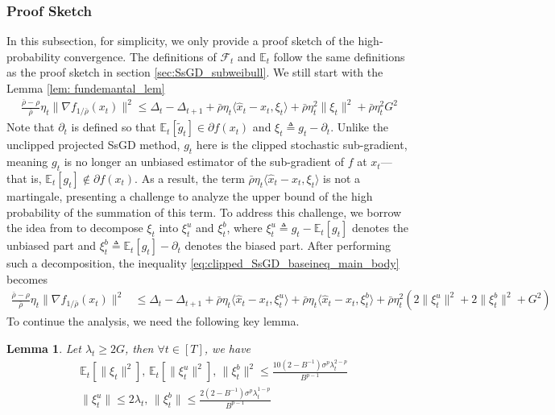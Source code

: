\documentclass{article}
\newtheorem{lemma}{Lemma}
\def \E {\mathbb{E}}
\begin{document}
\subsubsection{Proof Sketch} 
In this subsection, for simplicity, we only provide a proof sketch of the high-probability convergence. The definitions of $\mathcal{F}_t$ and $\E_t$ follow the same definitions as the proof sketch in section \ref{sec:SsGD_subweibull}. 
We still start with the Lemma \ref{lem: fundemantal_lem}
\begin{align}\label{eq:clipped_SsGD_baseineq_main_body}
    \frac{\bar{\rho}-\rho}{\bar{\rho}}\eta_t\|\nabla f_{1/\bar{\rho}}(x_t)\|^2\leq \Delta_t-\Delta_{t+1} + \bar{\rho}\eta_t\langle \hat{x}_t-x_t, \xi_t\rangle + \bar{\rho}\eta_t^2\|\xi_t\|^2 + \bar{\rho}\eta_t^2G^2
\end{align}
Note that $\partial_t$ is defined so that $\mathbb{E}_t[\widetilde{g}_t] \in \partial f(x_t)$ and $\xi_t\triangleq g_t-\partial_t$. Unlike the unclipped projected SsGD method, $g_t$ here is the clipped stochastic sub-gradient, meaning $g_t$ is no longer an unbiased estimator of the sub-gradient of $f$ at $x_t$—that is, $\mathbb{E}_t[g_t] \notin \partial f(x_t)$. As a result, the term $\bar{\rho}\eta_t\langle \hat{x}_t - x_t, \xi_t\rangle$ is not a martingale, presenting a challenge to analyze the upper bound of the high probability of the summation of this term.
To address this challenge, we borrow the idea from \citep{Cutkosky_2021} to decompose $\xi_t$ into $\xi_t^u$ and $\xi_t^b$, where $\xi_t^u \triangleq g_t - \mathbb{E}_t[g_t]$ denotes the unbiased part and $\xi_t^b \triangleq \mathbb{E}_t[g_t] - \partial_t$ denotes the biased part. After performing such a decomposition, the inequality \eqref{eq:clipped_SsGD_baseineq_main_body} becomes
\begin{align}\label{eq: decomposition_fundemental_lemma_clipped_SsGD}
    \frac{\bar{\rho}-\rho}{\bar{\rho}}\eta_t\|\nabla f_{1/\bar{\rho}}(x_t)\|^2 &\leq \Delta_t-\Delta_{t+1}+\bar{\rho}\eta_t\langle \hat{x}_t-x_t,\xi_t^u\rangle+\bar{\rho}\eta_t\langle \hat{x}_t-x_t,\xi_t^b\rangle+ \bar{\rho}\eta_t^2(2\|\xi_t^u\|^2+2\|\xi_t^b\|^2+G^2)
\end{align}
To continue the analysis, we need the following key lemma.
\begin{lemma}\label{lem:key_lemma_clipped_SsGD}
    Let $\lambda_t\geq 2G$, then $\forall t\in[T]$, we have
    \begin{align}
    &\E_t[\|\xi_t\|^2],\, \E_t[\|\xi_t^u\|^2], \, \|\xi_t^b\|^2 \leq \frac{10(2-B^{-1})\sigma^p\lambda_t^{2-p}}{B^{p-1}}\nonumber\\
    &\|\xi_t^u\|\leq 2\lambda_t,\,\|\xi_t^b\|\leq \frac{2(2-B^{-1})\sigma^p\lambda_t^{1-p}}{B^{p-1}}
    \end{align}
\end{lemma}
\end{document}
